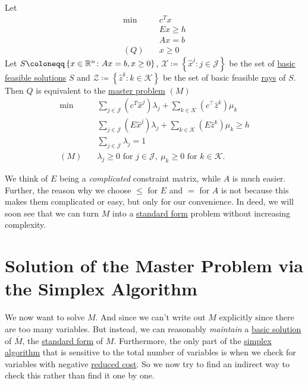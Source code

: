 \begin{theorem}\label{thm:decomposition-theorem}
	Let
	\begin{align*}
		\min~    & c^Tx      \\
		         & Ex \geq h \\
		         & Ax = b    \\
		(Q)\quad & x\geq 0
	\end{align*}
	Let \(S\coloneqq \left\{ x\in\mathbb{\MakeUppercase{R}}^n\colon Ax = b, x\geq 0 \right\}\), \(\mathcal{X} \coloneqq \left\{\hat{x}^j\colon j\in\mathcal{J} \right\}\) be
	the set of \hyperref[def:basic-solution]{basic} \hyperref[def:feasible-solution]{feasible solutions} \(S\) and
	\(\mathcal{Z} \coloneqq \left\{\hat{z}^k\colon k\in\mathcal{K} \right\}\) be the set of basic feasible \hyperref[def:ray]{rays} of \(S\). Then \(Q\) is equivalent to
	the \hyperref[def:master-problem]{master problem} \((M)\)
	\begin{align*}
		\min~    & \sum\limits_{j\in\mathcal{J}}\left(c^T\hat{x}^j\right)\lambda_{j} + \sum\limits_{k\in\mathcal{K}}\left(c^{\top} \hat{z}^k  \right)\mu_k \\
		         & \sum\limits_{j\in\mathcal{J}}\left(E\hat{x}^j\right)\lambda_{j} + \sum\limits_{k\in\mathcal{K}}\left(E \hat{z}^k \right)\mu_k \geq h    \\
		         & \sum\limits_{j\in\mathcal{J}}\lambda_{j} = 1                                                                                            \\
		(M)\quad & \lambda_{j}\geq 0 \text{ for }j\in\mathcal{J},\ \mu_k\geq 0 \text{ for }k\in\mathcal{K}.
	\end{align*}
\end{theorem}

\begin{remark}
	We think of \(E\) being a \emph{complicated} constraint matrix, while \(A\) is much easier. Further, the reason why we choose \(\leq \) for \(E\) and \(=\) for \(A\) is not because
	this makes them complicated or easy, but only for our convenience. In deed, we will soon see that we can turn \(M\) into a \hyperref[def:standard-form]{standard form} problem
	without increasing complexity.
\end{remark}

\section{Solution of the Master Problem via the Simplex Algorithm}
We now want to solve \(M\). And since we can't write out \(M\) explicitly since there are too many variables. But instead, we can reasonably
\emph{maintain} a \hyperref[def:basic-solution]{basic solution} of \(\overline{M}\), the \hyperref[def:standard-form]{standard form} of \(M\).
Furthermore, the only part of the \hyperref[algo:simplex-algorithm]{simplex algorithm} that is sensitive to the total number of variables is
when we check for variables with negative \hyperref[def:reduced-cost]{reduced cost}. So we now try to find an indirect way to check this rather than find it one by one.


